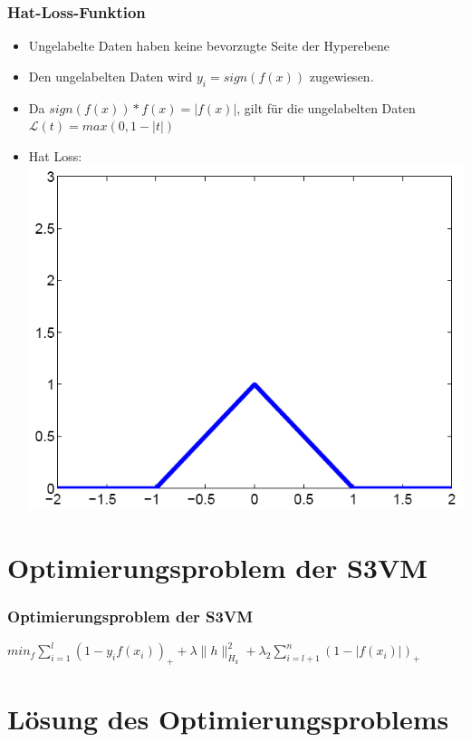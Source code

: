 \documentclass{beamer}
\begin{document}
\begin{frame}
\frametitle{Hat-Loss-Funktion}
    \begin{itemize}
        \item Ungelabelte Daten haben keine bevorzugte Seite der Hyperebene
        \item Den ungelabelten Daten wird $y_i = sign(f(x))$ zugewiesen. 
        \item Da $sign(f(x))*f(x) = |f(x)|$, gilt f\"ur die ungelabelten Daten $\mathcal{L}(t) = max(0, 1-|t|)$
        \item Hat Loss: \includegraphics[scale=0.2]{img/hat_loss_function.png}
    \end{itemize}
\end{frame}




\section{Optimierungsproblem der S3VM}

\begin{frame}
\frametitle{Optimierungsproblem der S3VM}
    $min_f \sum_{i=1}^l (1-y_i f(x_i))_+ + \lambda \|h\|^2_{H_k} + \lambda_2 \sum_{i=l+1}^n (1- |f(x_i)|)_+$
\end{frame}


\section{L\"osung des Optimierungsproblems}
\end{document}
